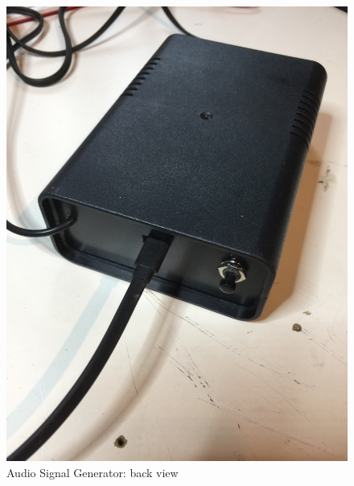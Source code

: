 \documentclass[11pt, oneside]{scrartcl}   	%
\begin{document}
\begin{figure}[tbph]
	\centering
	\includegraphics[width=\linewidth,angle=-90]{AudioSignalGeneratorTopBackViewClosed.jpeg}
	\caption[Audio Signal Generator: back view]{Audio Signal Generator: back view}
	\label{fig:mechanics}
\end{figure}

\newpage
\end{document}
